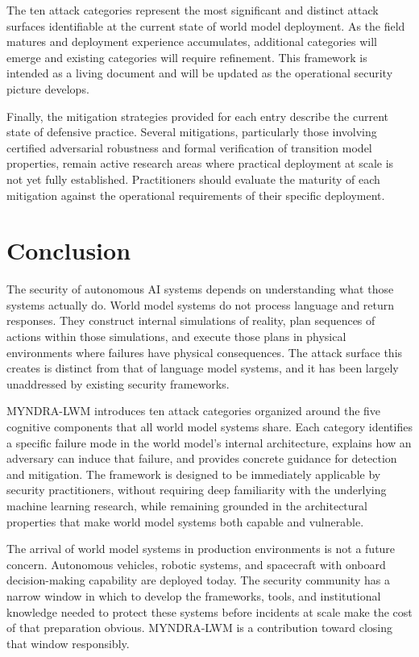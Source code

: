 \documentclass[11pt,a4paper]{article}
\begin{document}
The ten attack categories represent the most significant and distinct attack surfaces identifiable at the current state of world model deployment. As the field matures and deployment experience accumulates, additional categories will emerge and existing categories will require refinement. This framework is intended as a living document and will be updated as the operational security picture develops.

Finally, the mitigation strategies provided for each entry describe the current state of defensive practice. Several mitigations, particularly those involving certified adversarial robustness and formal verification of transition model properties, remain active research areas where practical deployment at scale is not yet fully established. Practitioners should evaluate the maturity of each mitigation against the operational requirements of their specific deployment.

\section{Conclusion}

The security of autonomous AI systems depends on understanding what those systems actually do. World model systems do not process language and return responses. They construct internal simulations of reality, plan sequences of actions within those simulations, and execute those plans in physical environments where failures have physical consequences. The attack surface this creates is distinct from that of language model systems, and it has been largely unaddressed by existing security frameworks.

MYNDRA-LWM introduces ten attack categories organized around the five cognitive components that all world model systems share. Each category identifies a specific failure mode in the world model's internal architecture, explains how an adversary can induce that failure, and provides concrete guidance for detection and mitigation. The framework is designed to be immediately applicable by security practitioners, without requiring deep familiarity with the underlying machine learning research, while remaining grounded in the architectural properties that make world model systems both capable and vulnerable.

The arrival of world model systems in production environments is not a future concern. Autonomous vehicles, robotic systems, and spacecraft with onboard decision-making capability are deployed today. The security community has a narrow window in which to develop the frameworks, tools, and institutional knowledge needed to protect these systems before incidents at scale make the cost of that preparation obvious. MYNDRA-LWM is a contribution toward closing that window responsibly.
\end{document}
